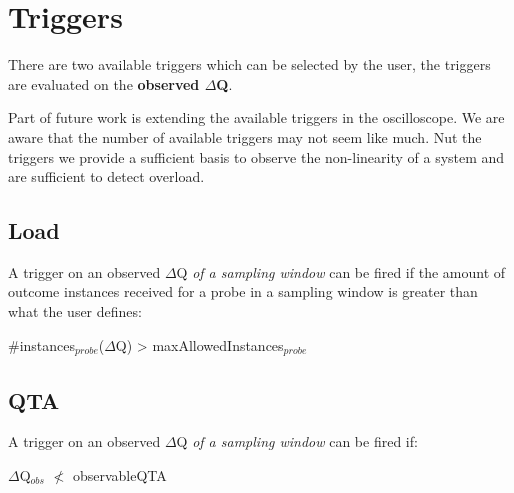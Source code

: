 \section{Triggers}
    There are two available triggers which can be selected by the user, the triggers are evaluated on the \textbf{observed $\Delta$Q}.

    Part of future work is extending the available triggers in the oscilloscope. We are aware that the number of available triggers may not seem like much. Nut the triggers we provide a sufficient basis to observe the non-linearity of a system and are sufficient to detect overload.
    \subsection{Load}
        A trigger on an observed $\Delta$Q \textit{of a sampling window} can be fired if the amount of outcome instances received for a probe in a sampling window is greater than what the user defines:
    \begin{center}
        \#instances$_{probe}$($\Delta$Q) > maxAllowedInstances$_{probe}$ 
    \end{center}

    \subsection{QTA}
        A trigger on an observed $\Delta$Q \textit{of a sampling window} can be fired if:
        \begin{center}
            $\Delta$Q$_{obs}$ $\nless$ observableQTA
        \end{center}
